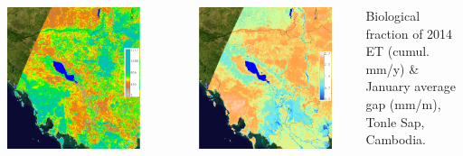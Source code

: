\documentclass[25pt, margin=0mm, innermargin=15mm, blockverticalspace=15mm, colspace=15mm, subcolspace=8mm]{tikzposter}
\begin{document}
\begin{columns}
{\begin{minipage}{0.5\linewidth}
\begin{center}
\includegraphics[width=0.9\textwidth]{TonleSapTa}
\end{center}
\end{minipage}
~
\begin{minipage}{0.5\linewidth}
\begin{center}
\includegraphics[width=0.9\textwidth]{TonleSapTaGap}
\end{center}
\end{minipage}
\vspace{2mm}
\begin{center}
Biological fraction of 2014 ET (cumul. mm/y) \& January average gap (mm/m), Tonle Sap, Cambodia.
\end{center}

}
\end{columns}
\end{document}

